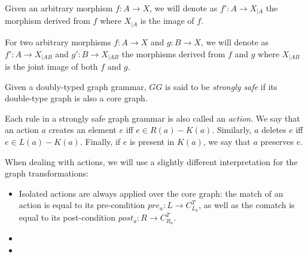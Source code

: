 \begin{notation} Given an arbitrary morphism $f : A \rightarrow X$, we will denote as $f' : A \rightarrow X_{|A}$ the morphism derived from $f$ where $X_{|A}$ is the image of $f$.

  For two arbitrary morphisms $f : A \rightarrow X$ and $g : B \rightarrow X$, we will denote as $f' : A \rightarrow X_{|AB}$ and $g' : B \rightarrow X_{|AB}$ the morphisms derived from $f$ and $g$ where $X_{|AB}$ is the joint image of both $f$ and $g$.
\end{notation}

\begin{definition} Given \doublyTypedGraphGrammarCore{} a doubly-typed graph grammar, $GG$ is said to be \emph{strongly safe} if its double-type graph is also a core graph.

  Each rule in a strongly safe graph grammar is also called an \emph{action}. We say that an action $a$ creates an element $e$ iff $e \in R(a) - K(a)$. Similarly, $a$ deletes $e$ iff \mbox{$e \in L(a) - K(a)$}. Finally, if $e$ is present in $K(a)$, we say that $a$ preserves $e$. 

When dealing with actions, we will use a slightly different interpretation for the graph transformations: 
  
\begin{itemize} 
  \item Isolated actions are always applied over the core graph: the match of an action is equal to its pre-condition $pre_a : L \rightarrow C^T_{L_a}$, as well as the comatch is equal to its post-condition $post_a : R \rightarrow C^T_{R_a}$.

  \item {}

  \item {}
\end{itemize}
\end{definition}

